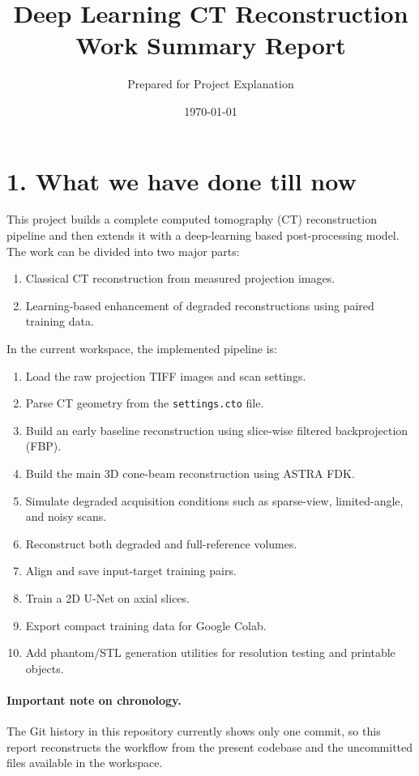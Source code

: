 \documentclass[12pt,a4paper]{article}
\title{Deep Learning CT Reconstruction\\Work Summary Report}
\author{Prepared for Project Explanation}
\date{\today}
\begin{document}
\maketitle

\section*{1. What we have done till now}
This project builds a complete computed tomography (CT) reconstruction pipeline and then extends it with a deep-learning based post-processing model. The work can be divided into two major parts:

\begin{enumerate}[leftmargin=*]
\item Classical CT reconstruction from measured projection images.
\item Learning-based enhancement of degraded reconstructions using paired training data.
\end{enumerate}

In the current workspace, the implemented pipeline is:
\begin{enumerate}[leftmargin=*]
\item Load the raw projection TIFF images and scan settings.
\item Parse CT geometry from the \texttt{settings.cto} file.
\item Build an early baseline reconstruction using slice-wise filtered backprojection (FBP).
\item Build the main 3D cone-beam reconstruction using ASTRA FDK.
\item Simulate degraded acquisition conditions such as sparse-view, limited-angle, and noisy scans.
\item Reconstruct both degraded and full-reference volumes.
\item Align and save input-target training pairs.
\item Train a 2D U-Net on axial slices.
\item Export compact training data for Google Colab.
\item Add phantom/STL generation utilities for resolution testing and printable objects.
\end{enumerate}

\paragraph{Important note on chronology.}
The Git history in this repository currently shows only one commit, so this report reconstructs the workflow from the present codebase and the uncommitted files available in the workspace.
\end{document}
